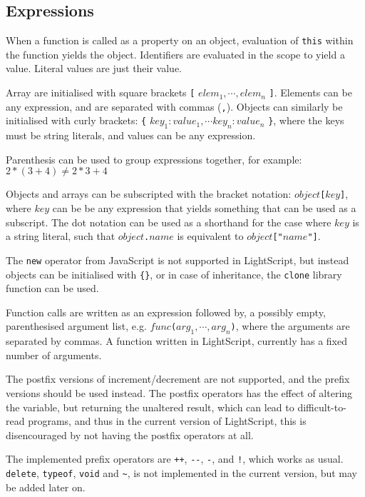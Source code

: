 \documentclass[11pt]{report}
\begin{document}
\subsection{Expressions}

When a function is called as a property on an object, evaluation of \verb|this| within the function yields the object.  Identifiers are evaluated in the scope to yield a value. Literal values are just their value.

Array are initialised with square brackets \verb|[| $elem_1,\cdots,elem_n$ \verb|]|. Elements can be any expression, and are separated with commas (\verb|,|). 
Objects can similarly be initialised with curly brackets: \verb|{| 
$key_1: value_1, \cdots key_n: value_n$ \verb|}|, where the keys must be string literals, and values can be any expression.

Parenthesis can be used to group expressions together, for example: $2 * (3 + 4) \neq 2 * 3 + 4$

Objects and arrays can be subscripted with the bracket notation: $object$\verb|[|$key$\verb|]|, where $key$ can be be any expression that yields something that can be used as a subscript. The dot notation can be used as a shorthand for the case where $key$ is a string literal, such that $object$\verb|.|$name$ is equivalent to $object$\verb|["|$name$\verb|"]|.

The \verb|new| operator from JavaScript is not supported in LightScript, but instead objects can be initialised with \verb|{}|, or in case of inheritance, the \verb|clone| library function can be used.

Function calls are written as an expression followed by, a possibly empty, parenthesised argument list, e.g. $func$\verb|(|$arg_1,\cdots,arg_n$\verb|)|, where the arguments are separated by commas. 
A function written in LightScript, currently has a fixed number of arguments.

The postfix versions of increment/decrement are not supported, and the prefix versions should be used instead. The postfix operators has the effect of altering the variable, but returning the unaltered result, which can lead to difficult-to-read programs, and thus in the current version of LightScript, this is disencouraged by not having the postfix operators at all.

The implemented prefix operators are \verb|++|, \verb|--|, \verb|-|, and \verb|!|, which works as usual. \verb|delete|, \verb|typeof|, \verb|void| and \verb|~|, is not implemented in the current version, but may be added later on.
\end{document}
